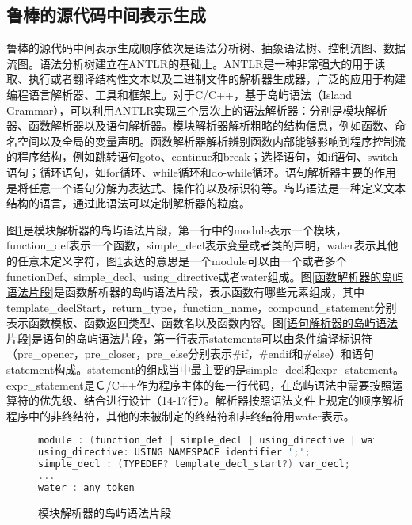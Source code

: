 \subsection{鲁棒的源代码中间表示生成}
\label{源代码的鲁棒分析}
鲁棒的源代码中间表示生成顺序依次是语法分析树、抽象语法树、控制流图、数据流图。语法分析树建立在ANTLR的基础上。ANTLR是一种非常强大的用于读取、执行或者翻译结构性文本以及二进制文件的解析器生成器，广泛的应用于构建编程语言解析器、工具和框架上。对于C/C++，基于岛屿语法{（Island Grammar）}，可以利用ANTLR实现三个层次上的语法解析器：分别是模块解析器、函数解析器以及语句解析器。模块解析器解析粗略的结构信息，例如函数、命名空间以及全局的变量声明。函数解析器解析辨别函数内部能够影响到程序控制流的程序结构，例如跳转语句goto、continue和break；选择语句，如if语句、switch语句；循环语句，如for循环、while循环和do-while循环。语句解析器主要的作用是将任意一个语句分解为表达式、操作符以及标识符等。岛屿语法是一种定义文本结构的语言，通过此语法可以定制解析器的粒度。

图\ref{模块解析器的岛屿语法片段}是模块解析器的岛屿语法片段，第一行中的module表示一个模块，function\_def表示一个函数，simple\_decl表示变量或者类的声明，water表示其他的任意未定义字符，图\ref{模块解析器的岛屿语法片段}表达的意思是一个module可以由一个或者多个functionDef、simple\_decl、using\_directive或者water组成。图\ref{函数解析器的岛屿语法片段}是函数解析器的岛屿语法片段，表示函数有哪些元素组成，其中template\_declStart，return\_type，function\_name，compound\_statement分别表示函数模板、函数返回类型、函数名以及函数内容。图\ref{语句解析器的岛屿语法片段}是语句的岛屿语法片段，第一行表示statements可以由条件编译标识符{（pre\_opener，pre\_closer，pre\_else分别表示\#if，\#endif和\#else）}和语句statement构成。statement的组成当中最主要的是simple\_decl和expr\_statement。expr\_statement是Ｃ/C++作为程序主体的每一行代码，在岛屿语法中需要按照运算符的优先级、结合进行设计{（14-17行）}。解析器按照语法文件上规定的顺序解析程序中的非终结符，其他的未被制定的终结符和非终结符用water表示。

\begin{figure}[h]
\begin{lstlisting}[language=C]
module : (function_def | simple_decl | using_directive | water)*;
using_directive: USING NAMESPACE identifier ';';
simple_decl : (TYPEDEF? template_decl_start?) var_decl;
...
water : any_token
\end{lstlisting}
\caption{模块解析器的岛屿语法片段}
\label{模块解析器的岛屿语法片段}
\end{figure}

